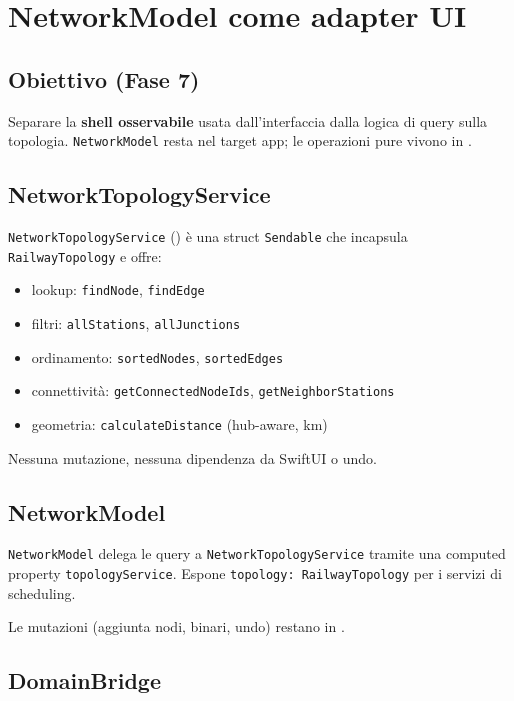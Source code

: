 \chapter{NetworkModel come adapter UI}
\label{ch:network-adapter}

\section{Obiettivo (Fase 7)}

Separare la \textbf{shell osservabile} usata dall'interfaccia dalla logica
di query sulla topologia. \texttt{NetworkModel} resta nel target app;
le operazioni pure vivono in .

\section{NetworkTopologyService}

\texttt{NetworkTopologyService} () è una struct
\texttt{Sendable} che incapsula \texttt{RailwayTopology} e offre:

\begin{itemize}
  \item lookup: \texttt{findNode}, \texttt{findEdge}
  \item filtri: \texttt{allStations}, \texttt{allJunctions}
  \item ordinamento: \texttt{sortedNodes}, \texttt{sortedEdges}
  \item connettività: \texttt{getConnectedNodeIds}, \texttt{getNeighborStations}
  \item geometria: \texttt{calculateDistance} (hub-aware, km)
\end{itemize}

Nessuna mutazione, nessuna dipendenza da SwiftUI o undo.

\section{NetworkModel}

\texttt{NetworkModel} delega le query a \texttt{NetworkTopologyService}
tramite una computed property \texttt{topologyService}. Espone
\texttt{topology: RailwayTopology} per i servizi di scheduling.

Le mutazioni (aggiunta nodi, binari, undo) restano in
.

\section{DomainBridge}

